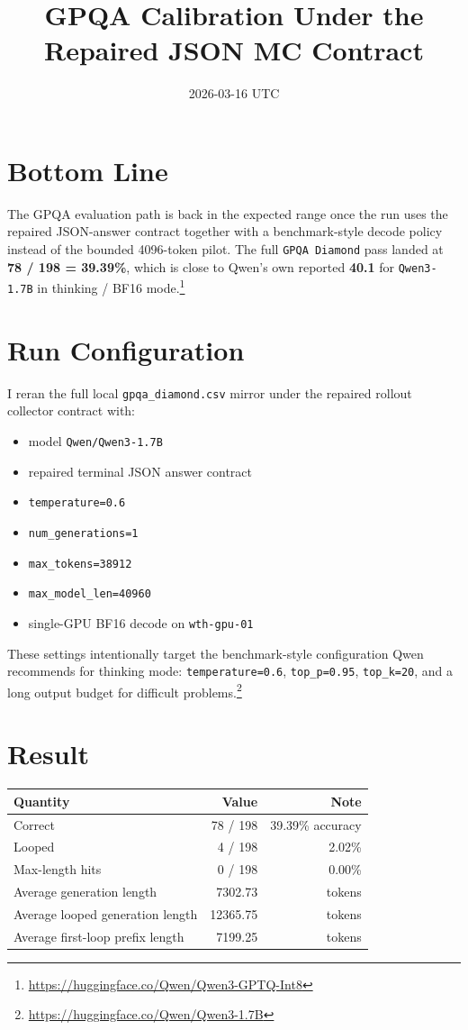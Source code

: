\documentclass[11pt]{article}
\title{GPQA Calibration Under the Repaired JSON MC Contract}
\date{2026-03-16 UTC}
\begin{document}
\maketitle

\section*{Bottom Line}
The GPQA evaluation path is back in the expected range once the run uses the repaired
JSON-answer contract together with a benchmark-style decode policy instead of the
bounded 4096-token pilot. The full \texttt{GPQA Diamond} pass landed at
\textbf{78 / 198 = 39.39\%}, which is close to Qwen's own reported
\textbf{40.1} for \texttt{Qwen3-1.7B} in thinking / BF16 mode.\footnote{\url{https://huggingface.co/Qwen/Qwen3-GPTQ-Int8}}

\section*{Run Configuration}
I reran the full local \texttt{gpqa\_diamond.csv} mirror under the repaired rollout
collector contract with:
\begin{itemize}
\item model \texttt{Qwen/Qwen3-1.7B}
\item repaired terminal JSON answer contract
\item \texttt{temperature=0.6}
\item \texttt{num\_generations=1}
\item \texttt{max\_tokens=38912}
\item \texttt{max\_model\_len=40960}
\item single-GPU BF16 decode on \texttt{wth-gpu-01}
\end{itemize}

These settings intentionally target the benchmark-style configuration Qwen recommends
for thinking mode: \texttt{temperature=0.6}, \texttt{top\_p=0.95},
\texttt{top\_k=20}, and a long output budget for difficult problems.\footnote{\url{https://huggingface.co/Qwen/Qwen3-1.7B}}

\section*{Result}
\begin{center}
\begin{tabular}{lrr}
\toprule
Quantity & Value & Note \\
\midrule
Correct & 78 / 198 & 39.39\% accuracy \\
Looped & 4 / 198 & 2.02\% \\
Max-length hits & 0 / 198 & 0.00\% \\
Average generation length & 7302.73 & tokens \\
Average looped generation length & 12365.75 & tokens \\
Average first-loop prefix length & 7199.25 & tokens \\
\bottomrule
\end{tabular}
\end{center}
\end{document}
